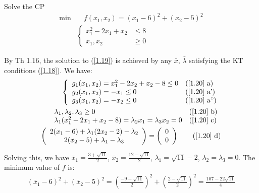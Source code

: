 \begin{example}
    Solve the CP 
    \begin{align}
        \min &\quad f(x_1, x_2) = (x_1 - 6)^2 + (x_2 - 5)^2 \nonumber \\
        & \left\lbrace  \begin{array}{rl}
        x_1^2 -2x_1+x_2 &\le 8  \\
        x_1,x_2 &\ge 0
        \end{array} \label{1.19}\right.
    \end{align}

    By Th 1.16, the solution to (\ref{1.19}) is achieved by any $\bar{x}$, $\bar{\lambda}$ satisfying the KT conditions (\ref{1.18}). We have:
    \begin{align}
        \label{1.20}\left\lbrace\begin{array}{ll}
            g_1(x_1, x_2) = x_1^2 - 2x_2 +x_2 - 8 \le 0 & \text{(\ref{1.20} a)} \\
            g_2(x_1, x_2) = -x_1 \le 0 & \text{(\ref{1.20} a')}\\
            g_3(x_1, x_2) = -x_2 \le 0 & \text{(\ref{1.20} a'')}
        \end{array}\right.  \\
        \begin{array}{ll}
             \lambda_1, \lambda_2, \lambda_3\ge 0 & \text{(\ref{1.20} b)} \nonumber \\
            \lambda_1(x_1^2-2x_1+x_2-8) = \lambda_2 x_1 = \lambda_3 x_2 = 0 & \text{(\ref{1.20} c)}
        \end{array} \\
        \left(\begin{array}{c}
            2(x_1-6) + \lambda_1(2x_2-2) -\lambda_2  \\
            2(x_2 - 5) + \lambda_1 - \lambda_3 
        \end{array} \right) = \left( \begin{array}{c}
             0 \\
             0 
        \end{array}\right) \quad \quad \text{(\ref{1.20} d)}\nonumber
    \end{align}

    Solving this, we have $\bar{x}_1 = \frac{3+\sqrt{11}}{2}$, $\bar{x}_2 = \frac{12-\sqrt{11}}{2}$, $\lambda_1 = \sqrt{11} - 2$, $\lambda_2 = \lambda_3 = 0$. The minimum value of $f$ is:
    \begin{align*}
        (\bar{x}_1 - 6)^2 + (\bar{x}_2 - 5)^2 = \left(\frac{-9 + \sqrt{11}}{2}\right)^2 + \left(\frac{2-\sqrt{11}}{2}\right)^2 = \frac{107-22\sqrt{11}}{4}
    \end{align*}
\end{example}

